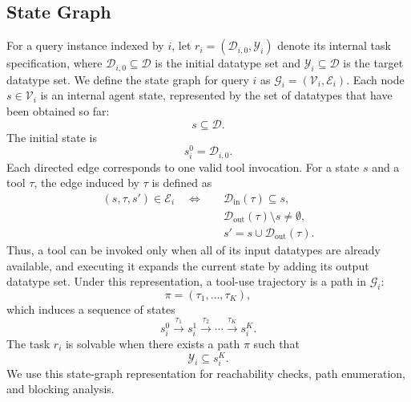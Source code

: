 

\subsection{State Graph}
\label{app:state-graph}

For a query instance indexed by $i$, let $r_i=(\mathcal{D}_{i,0}, \mathcal{Y}_i)$ denote its internal task specification, where $\mathcal{D}_{i,0}\subseteq\mathcal{D}$ is the initial datatype set and $\mathcal{Y}_i\subseteq\mathcal{D}$ is the target datatype set.
We define the state graph for query $i$ as $\mathcal{G}_i=(\mathcal{V}_i,\mathcal{E}_i)$.
Each node $s \in \mathcal{V}_i$ is an internal agent state, represented by the set of datatypes that have been obtained so far:
\begin{equation}
s \subseteq \mathcal{D}.
\end{equation}
The initial state is
\begin{equation}
s_i^0 = \mathcal{D}_{i,0}.
\end{equation}
Each directed edge corresponds to one valid tool invocation. 
For a state $s$ and a tool $\tau$, the edge induced by $\tau$ is defined as
\begin{equation}
\begin{aligned}
(s,\tau,s') \in \mathcal{E}_i
\quad \Longleftrightarrow \quad
& \mathcal{D}_{\mathrm{in}}(\tau) \subseteq s, \\
& \mathcal{D}_{\mathrm{out}}(\tau) \setminus s \neq \emptyset, \\
& s' = s \cup \mathcal{D}_{\mathrm{out}}(\tau).
\end{aligned}
\end{equation}
Thus, a tool can be invoked only when all of its input datatypes are already available, and executing it expands the current state by adding its output datatype set.
Under this representation, a tool-use trajectory is a path in $\mathcal{G}_i$:
\begin{equation}
\pi = (\tau_1,\ldots,\tau_K),
\end{equation}
which induces a sequence of states
\begin{equation}
s_i^0 \xrightarrow{\tau_1} s_i^1 \xrightarrow{\tau_2} \cdots \xrightarrow{\tau_K} s_i^K.
\end{equation}
The task $r_i$ is solvable when there exists a path $\pi$ such that
\begin{equation}
\mathcal{Y}_i \subseteq s_i^K.
\end{equation}
We use this state-graph representation for reachability checks, path enumeration, and blocking analysis.

